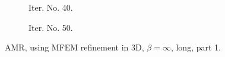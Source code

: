 \documentclass[a4paper,12pt]{amsart}
\numberwithin{equation}{section}
\begin{document}
\begin{figure}[h!]
\begin{subfigure}[t]{0.49\textwidth}
    \caption{Iter. No. 40.}
\end{subfigure}
	\hfill
\begin{subfigure}[t]{0.49\textwidth}
    \caption{Iter. No. 50.}
\end{subfigure}

\caption{AMR, using MFEM refinement in 3D, $\beta = \infty$, long, part 1.}
\label{fig:amr_trans3D_paraview_mfem_longrun_part1}
\end{figure}
\end{document}
